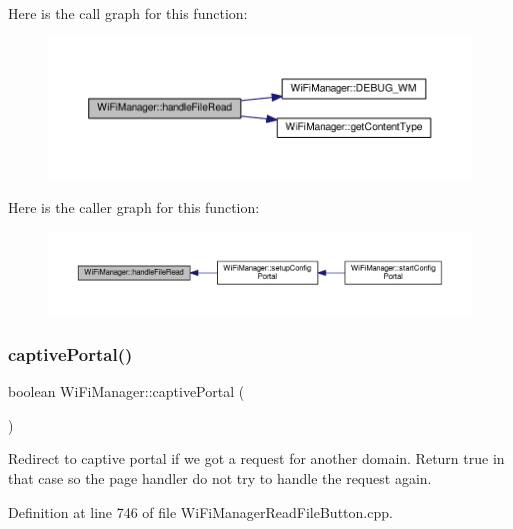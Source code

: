 Here is the call graph for this function\+:
\nopagebreak
\begin{figure}[H]
\begin{center}
\leavevmode
\includegraphics[width=350pt]{d4/dc8/class_wi_fi_manager_a9e802fa4ca834a622f058a7176f47806_cgraph}
\end{center}
\end{figure}
Here is the caller graph for this function\+:
\nopagebreak
\begin{figure}[H]
\begin{center}
\leavevmode
\includegraphics[width=350pt]{d4/dc8/class_wi_fi_manager_a9e802fa4ca834a622f058a7176f47806_icgraph}
\end{center}
\end{figure}
\mbox{\label{class_wi_fi_manager_a4ef4298deb224212e5242c456669a973}} 
\subsubsection{\texorpdfstring{captive\+Portal()}{captivePortal()}}
{\footnotesize\ttfamily boolean Wi\+Fi\+Manager\+::captive\+Portal (\begin{DoxyParamCaption}{ }\end{DoxyParamCaption})\hspace{0.3cm}{\ttfamily [private]}}

Redirect to captive portal if we got a request for another domain. Return true in that case so the page handler do not try to handle the request again. 

Definition at line 746 of file Wi\+Fi\+Manager\+Read\+File\+Button.\+cpp.



